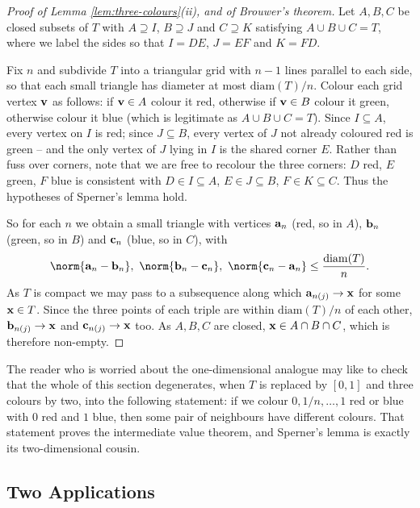 \documentclass[a4paper]{scrartcl}
\begin{document}
\begin{proof}[Proof of Lemma \ref{lem:three-colours}(ii), and of Brouwer's theorem]
	Let $A,B,C$ be closed subsets of $T$ with $A \supseteq I$, $B \supseteq J$ and $C \supseteq K$ satisfying $A \cup B \cup C = T$, where we label the sides so that $I = DE$, $J = EF$ and $K = FD$.

	Fix $n$ and subdivide $T$ into a triangular grid with $n-1$ lines parallel to each side, so that each small triangle has diameter at most $\mathrm{diam}(T)/n$. Colour each grid vertex $\mathbf{v}$ as follows: if $\mathbf{v} \in A$ colour it red, otherwise if $\mathbf{v}\in B$ colour it green, otherwise colour it blue (which is legitimate as $A\cup B\cup C = T$). Since $I \subseteq A$, every vertex on $I$ is red; since $J \subseteq B$, every vertex of $J$ not already coloured red is green -- and the only vertex of $J$ lying in $I$ is the shared corner $E$. Rather than fuss over corners, note that we are free to recolour the three corners: $D$ red, $E$ green, $F$ blue is consistent with $D \in I \subseteq A$, $E \in J \subseteq B$, $F \in K \subseteq C$. Thus the hypotheses of Sperner's lemma hold.

	So for each $n$ we obtain a small triangle with vertices $\mathbf{a}_n$ (red, so in $A$), $\mathbf{b}_n$ (green, so in $B$) and $\mathbf{c}_n$ (blue, so in $C$), with
	$$\norm{\vv{a}_n - \vv{b}_n},\ \norm{\vv{b}_n-\vv{c}_n},\ \norm{\vv{c}_n-\vv{a}_n} \leq \frac{\mathrm{diam}(T)}{n}.$$
	As $T$ is compact we may pass to a subsequence along which $\mathbf{a}_{n(j)} \to \mathbf{x}$ for some $\mathbf{x}\in T$. Since the three points of each triple are within $\mathrm{diam}(T)/n$ of each other, $\mathbf{b}_{n(j)} \to \mathbf{x}$ and $\mathbf{c}_{n(j)}\to\mathbf{x}$ too. As $A, B, C$ are closed, $\mathbf{x} \in A\cap B\cap C$, which is therefore non-empty.
\end{proof}

The reader who is worried about the one-dimensional analogue may like to check that the whole of this section degenerates, when $T$ is replaced by $[0,1]$ and three colours by two, into the following statement: if we colour $0,1/n,\ldots,1$ red or blue with $0$ red and $1$ blue, then some pair of neighbours have different colours. That statement proves the intermediate value theorem, and Sperner's lemma is exactly its two-dimensional cousin.

\subsection{Two Applications}
\end{document}

